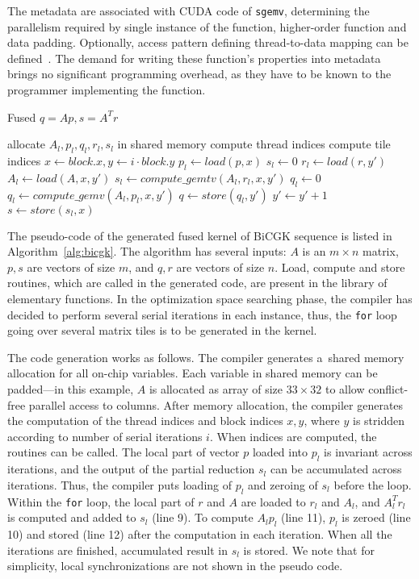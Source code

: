 \documentclass[final]{siamltex}
\begin{document}
{The metadata are associated with CUDA code of \texttt{sgemv}, determining the parallelism required by single instance of the function, higher-order function and data padding. Optionally, access pattern defining thread-to-data mapping can be defined~\cite{filipovic2012automatically}. The demand for writing these function's properties into metadata brings no significant programming overhead, as they have to be known to the programmer implementing the function.

\begin{algorithm}[h]
\caption{Fused $q = Ap, s = A^Tr$}
\label{alg:bicgk}
{
\begin{algorithmic}[1]
{
\STATE allocate $A_l, p_l, q_l, r_l, s_l$ in shared memory
\STATE compute thread indices
\STATE compute tile indices $x \leftarrow block.x, y \leftarrow i \cdot block.y$
\STATE $p_l \leftarrow load(p, x)$
\STATE $s_l \leftarrow 0$
\STATE $r_l \leftarrow load(r, y')$
\STATE $A_l \leftarrow load(A, x, y')$
\STATE $s_l \leftarrow compute\_gemtv(A_l, r_l, x, y')$
\STATE $q_l \leftarrow 0$
\STATE $q_l \leftarrow compute\_gemv(A_l, p_l, x, y')$
\STATE $q \leftarrow store(q_l, y')$
\STATE $y' \leftarrow y'+1$
\ENDFOR
\STATE $s \leftarrow store(s_l, x)$
}
\end{algorithmic}
}
\end{algorithm}

The pseudo-code of the generated fused kernel of BiCGK sequence is listed in Algorithm~\ref{alg:bicgk}. The algorithm has several inputs: $A$ is an $m \times n$ matrix, $p, s$ are vectors of size $m$, and $q, r$ are vectors of size $n$. Load, compute and store routines, which are called in the generated code, are present in the library of elementary functions.  In the optimization space searching phase, the compiler has decided to perform several serial iterations in each instance, thus, the \texttt{for} loop going over several matrix tiles is to be generated in the kernel.

The code generation works as follows. The compiler generates a~shared memory allocation for all on-chip variables. Each variable in shared memory can be padded---in this example, $A$ is allocated as array of size $33\times32$ to allow conflict-free parallel access to columns. After memory allocation, the compiler generates the computation of the thread indices and block indices $x, y$, where $y$ is stridden according to number of serial iterations $i$. When indices are computed, the routines can be called. The local part of vector $p$ loaded into $p_l$ is invariant across iterations, and the output of the partial reduction $s_l$ can be accumulated across iterations. Thus, the compiler puts loading of $p_l$ and zeroing of $s_l$ before the loop. Within the \texttt{for} loop, the local part of $r$ and $A$ are loaded to $r_l$ and $A_l$, and $A^T_l r_l$ is computed and added to $s_l$ (line 9). To compute $A_l p_l$ (line 11), $p_l$ is zeroed (line 10) and stored (line 12) after the computation in each iteration. When all the iterations are finished, accumulated result in $s_l$ is stored. We note that for simplicity, local synchronizations are not shown in the pseudo code. 

}
\end{document}
